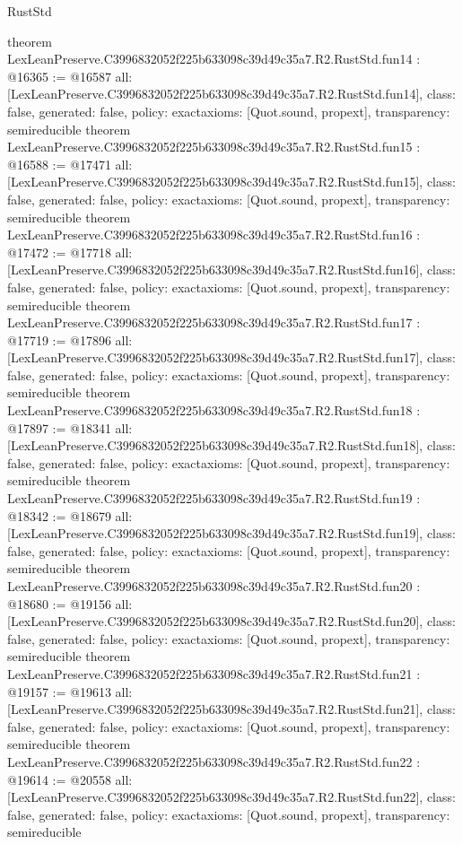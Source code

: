 \begin{lexlean}{RustStd}
\begin{coremodule}
{}
theorem LexLeanPreserve.C3996832052f225b633098c39d49c35a7.R2.RustStd.fun14 : @16365 := @16587 {
  all: [LexLeanPreserve.C3996832052f225b633098c39d49c35a7.R2.RustStd.fun14],
  class: false,
  generated: false,
  policy: exact{axioms: [Quot.sound, propext]},
  transparency: semireducible
}
theorem LexLeanPreserve.C3996832052f225b633098c39d49c35a7.R2.RustStd.fun15 : @16588 := @17471 {
  all: [LexLeanPreserve.C3996832052f225b633098c39d49c35a7.R2.RustStd.fun15],
  class: false,
  generated: false,
  policy: exact{axioms: [Quot.sound, propext]},
  transparency: semireducible
}
theorem LexLeanPreserve.C3996832052f225b633098c39d49c35a7.R2.RustStd.fun16 : @17472 := @17718 {
  all: [LexLeanPreserve.C3996832052f225b633098c39d49c35a7.R2.RustStd.fun16],
  class: false,
  generated: false,
  policy: exact{axioms: [Quot.sound, propext]},
  transparency: semireducible
}
theorem LexLeanPreserve.C3996832052f225b633098c39d49c35a7.R2.RustStd.fun17 : @17719 := @17896 {
  all: [LexLeanPreserve.C3996832052f225b633098c39d49c35a7.R2.RustStd.fun17],
  class: false,
  generated: false,
  policy: exact{axioms: [Quot.sound, propext]},
  transparency: semireducible
}
theorem LexLeanPreserve.C3996832052f225b633098c39d49c35a7.R2.RustStd.fun18 : @17897 := @18341 {
  all: [LexLeanPreserve.C3996832052f225b633098c39d49c35a7.R2.RustStd.fun18],
  class: false,
  generated: false,
  policy: exact{axioms: [Quot.sound, propext]},
  transparency: semireducible
}
theorem LexLeanPreserve.C3996832052f225b633098c39d49c35a7.R2.RustStd.fun19 : @18342 := @18679 {
  all: [LexLeanPreserve.C3996832052f225b633098c39d49c35a7.R2.RustStd.fun19],
  class: false,
  generated: false,
  policy: exact{axioms: [Quot.sound, propext]},
  transparency: semireducible
}
theorem LexLeanPreserve.C3996832052f225b633098c39d49c35a7.R2.RustStd.fun20 : @18680 := @19156 {
  all: [LexLeanPreserve.C3996832052f225b633098c39d49c35a7.R2.RustStd.fun20],
  class: false,
  generated: false,
  policy: exact{axioms: [Quot.sound, propext]},
  transparency: semireducible
}
theorem LexLeanPreserve.C3996832052f225b633098c39d49c35a7.R2.RustStd.fun21 : @19157 := @19613 {
  all: [LexLeanPreserve.C3996832052f225b633098c39d49c35a7.R2.RustStd.fun21],
  class: false,
  generated: false,
  policy: exact{axioms: [Quot.sound, propext]},
  transparency: semireducible
}
theorem LexLeanPreserve.C3996832052f225b633098c39d49c35a7.R2.RustStd.fun22 : @19614 := @20558 {
  all: [LexLeanPreserve.C3996832052f225b633098c39d49c35a7.R2.RustStd.fun22],
  class: false,
  generated: false,
  policy: exact{axioms: [Quot.sound, propext]},
  transparency: semireducible
}
\end{coremodule}
\end{lexlean}
